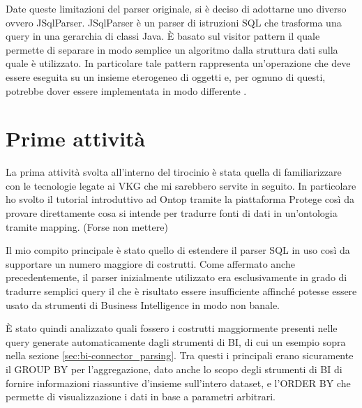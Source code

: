 Date queste limitazioni del parser originale, si è deciso di adottarne uno diverso ovvero JSqlParser. JSqlParser è un parser di istruzioni SQL
che trasforma una query in una gerarchia di classi Java. \`E basato sul visitor pattern il quale permette di separare in modo semplice un algoritmo dalla struttura dati sulla quale è utilizzato.
In particolare tale pattern rappresenta un'operazione che deve essere eseguita su un insieme eterogeneo di oggetti e, per ognuno di questi, potrebbe dover essere implementata in modo differente \cite{JSqlParser}.

\section{Prime attività}
\label{sec:prerequisits}
La prima attività svolta all'interno del tirocinio è stata quella di familiarizzare con le tecnologie legate ai VKG che mi sarebbero servite in seguito. In particolare ho svolto
il tutorial introduttivo ad Ontop tramite la piattaforma Protege così da provare direttamente cosa si intende per tradurre fonti di dati in un'ontologia tramite mapping. (Forse non mettere)

Il mio compito principale è stato quello di estendere il parser SQL in uso così da supportare un numero maggiore di costrutti. Come affermato anche precedentemente, il parser inizialmente utilizzato era
esclusivamente in grado di tradurre semplici query il che è risultato essere insufficiente affinché potesse essere usato da strumenti di Business Intelligence in modo non banale.

\`E stato quindi analizzato quali fossero i costrutti maggiormente presenti nelle query generate automaticamente dagli strumenti di BI, di cui un esempio sopra nella sezione \ref{sec:bi-connector_parsing}. Tra questi
i principali erano sicuramente il GROUP BY per l'aggregazione, dato anche lo scopo degli strumenti di BI di fornire informazioni riassuntive d'insieme sull'intero dataset, e l'ORDER BY che
permette di visualizzazione i dati in base a parametri arbitrari.

